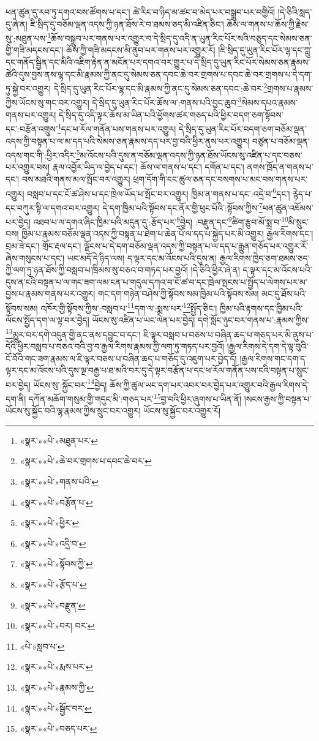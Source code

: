 ཕན་ཚུན་དུ་རབ་ཏུ་དགའ་བས་ཚོགས་པ་དང་། ཚེ་རིང་བ་ཉིད་མ་ཚང་བ་མེད་པར་བསྒྲུབ་པར་བགྱིའོ། །དེ་ཅིའི་སླད་དུ་ཞེ་ན། ཇི་སྲིད་དུ་བཅོམ་ལྡན་འདས་ཀྱི་ཉན་ཐོས་རེ་བ་ཐམས་ཅད་མི་འཛིན་ཅིང་། ཆོས་ལ་གནས་པ་ཆོས་ཀྱི་རྗེས་སུ་:མཐུན་པས་\footnote{«སྣར་»«པེ་»མཐུན་པར་}ཆོས་བསྒྲུབ་པར་གནས་པར་འགྱུར་བ་དེ་སྲིད་དུ་འདི་ན་ཡུན་རིང་པོར་སའི་བཅུད་དང་སེམས་ཅན་གྱི་གཟི་མདངས་དང་། ཆོས་ཀྱི་གཟི་མདངས་མི་ནུབ་པར་གནས་པར་འགྱུར་རོ། །ཇི་སྲིད་དུ་ཡུན་རིང་པོར་ལྷ་དང་ཀླུ་དང་གནོད་སྦྱིན་དང་མིའི་འཇིག་རྟེན་ན་མངོན་པར་དགའ་བར་གྱུར་པ་དེ་སྲིད་དུ་ཡུན་རིང་པོར་སེམས་ཅན་རྣམས་ཚེའི་དུས་བྱས་ནས་ལྷ་དང་མི་རྣམས་ཀྱི་ནང་དུ་སེམས་ཅན་དབང་ཆེ་བར་གྲགས་པ་དབང་ཆེ་བར་གྲགས་པ་དེ་དག་ཏུ་སྐྱེ་བར་འགྱུར། དེ་སྲིད་དུ་ཡུན་རིང་པོར་ལྷ་དང་མི་རྣམས་ཀྱི་ནང་དུ་སེམས་ཅན་དབང་:ཆེ་བར་\footnote{«སྣར་»«པེ་»ཆེ་བར་གྲགས་པ་དབང་ཆེ་བར་}གྲགས་པ་རྣམས་ཀྱིས་ཡོངས་སུ་གང་བར་འགྱུར། དེ་སྲིད་དུ་ཡུན་རིང་པོར་ཆོས་ལ་:གནས་པའི་བྱང་ཆུབ་\footnote{«སྣར་»«པེ་»གནས་པའི་}སེམས་དཔའ་རྣམས་གནས་པར་འགྱུར། དེ་སྲིད་དུ་འདི་ལྟར་ཆོས་མ་ཡིན་པའི་ཕྱོགས་ཚར་གཅད་པའི་ཕྱིར་བདག་ཅག་སྟོབས་དང་:བརྩོན་འགྲུས་\footnote{«སྣར་»«པེ་»བརྩོན་པ་}དང་ཕ་རོལ་གནོན་པས་གནས་པར་འགྱུར། དེ་སྲིད་དུ་ཡུན་རིང་པོར་བདག་ཅག་བཅོམ་ལྡན་འདས་ཀྱི་བསྟན་པ་ལ་མ་དད་པའི་སེམས་ཅན་རྣམས་དད་པར་བྱ་བའི་ཕྱིར་ནུས་པར་འགྱུར། བཙུན་པ་བཅོམ་ལྡན་འདས་གང་གི་:ཕྱིར་འདིར་\footnote{«སྣར་»«པེ་»ཕྱིར་}མ་འོངས་པའི་དུས་ན་བཅོམ་ལྡན་འདས་ཀྱི་ཉན་ཐོས་ཡོངས་སུ་འཛིན་པ་དང་བཅས་པར་འགྱུར་བས། རྣལ་འབྱོར་ཡིད་ལ་བྱེད་པ་དང་། ཆོས་ལ་གནས་པ་དང་། དགོན་པ་དང་། ནགས་ཁྲོད་ན་གནས་པ་དང་། བས་མཐའི་གནས་མལ་སྤོང་བར་འགྱུར། ཕྲག་དོག་གི་ངང་ཚུལ་ཅན་དང་བསགས་པ་མང་བས་གནས་པར་འགྱུར། བསླབ་པ་དང་ངོ་ཚ་ཤེས་པ་དང་ཁྲེལ་ཡོད་པ་སྤོང་བར་འགྱུར། ཁྱིམ་ན་གནས་པ་དང་:འདྲེ་བ་\footnote{«སྣར་»«པེ་»འདྲི་བ་}དང་། རྙེད་པ་དང་བཀུར་སྟི་ལ་དགའ་བར་འགྱུར། དེ་དག་ཁྱིམ་པའི་སྟོབས་དང་ནོར་གྱི་ཕུང་པོའི་:སྟོབས་ཀྱིས་\footnote{«སྣར་»«པེ་»སྟོབས་ཀྱི་}ཕན་ཚུན་འཇོམས་པར་བྱེད། འཐབ་པ་ལ་དགའ་ཞིང་ཁྱིམ་པའི་མདུན་དུ་:རྩོད་པར་\footnote{«སྣར་»«པེ་»རྩོད་པ་}བྱེད། :བརྫུན་དང་\footnote{«སྣར་»«པེ་»བརྫུན་}ཚིག་རྩུབ་མོ་སྨྲ་བ་\footnote{«སྣར་»«པེ་»བར། བར་}མི་སྲུང་བས། ཁྱིམ་པ་རྣམས་བཅོམ་ལྡན་འདས་ཀྱི་བསྟན་པ་ཐེག་པ་ཆེན་པོ་ལ་དད་པ་སྐྱེད་པར་མི་འགྱུར། རྒྱལ་རིགས་དང་། བྲམ་ཟེ་དང་། གྲོང་རྡལ་དང་། ལྗོངས་པ་དེ་དག་བཅོམ་ལྡན་འདས་ཀྱི་བསྟན་པ་ལ་དད་པ་རྒྱུན་གཅོད་པར་འགྱུར་རོ་ཞེས་གསུངས་པ་དང་། ཡང་མདོ་དེ་ཉིད་ལས། ད་ལྟར་དང་མ་འོངས་པའི་དུས་ན། རྒྱལ་རིགས་ཁྱེད་ཅག་ཐམས་ཅད་ཀྱི་ལག་ཏུ་ཉན་ཐོས་ཀྱི་བསླབ་པ་ཁྲིམས་སུ་བཅའ་བ་གཏད་པར་བྱའོ། །དེ་ཅིའི་ཕྱིར་ཞེ་ན། ད་ལྟར་དང་མ་འོངས་པའི་དུས་ན་ངའི་བསྟན་པ་ལ་གང་ཟག་ལམ་ངན་པ་གདུལ་དཀའ་བ་ངོ་ཚ་བ་དང་ཁྲེལ་སྤངས་པ་སྤྱོད་པ་ལེགས་པར་མ་བྱས་པ་རྣམས་གནས་པར་འགྱུར། གང་དག་གཉེན་བཤེས་ཀྱི་སྟོབས་སམ་ཁྱིམ་པའི་སྟོབས་སམ། མང་དུ་ཐོས་པའི་སྟོབས་སམ། འཁོར་གྱི་སྟོབས་ཀྱིས་:བསླབ་པ་\footnote{«པེ་»སླབ་པ་}དག་ལ་:སྨས་པར་\footnote{«སྣར་»«པེ་»རྨས་པར་}སྤྱོད་ཅིང་། ཁྱིམ་པའི་རྟགས་དང་ཁྱིམ་པའི་ལོངས་སྤྱོད་དག་ལ་ལྟ་བར་བྱེད། ཡོངས་སུ་འཛིན་པ་ཡང་ལེན་པར་བྱེད། དགེ་སློང་ཉུང་བར་གནས་པ་:རྣམས་ཀྱིས་\footnote{«སྣར་»«པེ་»རྣམས་ཀྱི་}མྱུར་བར་དགེ་འདུན་གྱི་ནང་ནས་དབྱུང་བ་དང་། ཇི་ལྟར་བསླབ་པ་བཅས་པ་བཞིན་ཆད་པ་གཅད་པར་མི་ནུས་པ་དེའི་ཕྱིར་བསླབ་པ་བཅའ་བའི་བྱ་བ་རྒྱལ་རིགས་རྣམས་ཀྱི་ལག་ཏུ་གཏད་པར་བྱའོ། །རྒྱལ་རིགས་དེ་དག་དེ་ལྟ་བུའི་ངོ་བོའི་གང་ཟག་རྣམས་ལ་ཇི་ལྟར་བཅས་པ་བཞིན་ཆད་པ་གཅོད་དུ་འཇུག་པར་བྱེད་དོ། །རྒྱལ་རིགས་གང་དག་ད་ལྟར་དང་མ་འོངས་པའི་དུས་ལྔ་བརྒྱ་པ་ཐ་མའི་བར་དུ་དེ་ལྟར་བརྩོན་པ་དང་ཕ་རོལ་གནོན་པས་ངའི་བསྟན་པ་སྲུང་བར་བྱེད། ཡོངས་སུ་:སྐྱོང་བར་\footnote{«སྣར་»«པེ་»སྦྱོང་བར་}བྱེད། ཆོས་ཀྱི་ཚུལ་ཡང་དག་པར་འབར་བར་བྱེད་པར་འགྱུར་བའི་རྒྱལ་རིགས་དེ་དག་ནི། དཀོན་མཆོག་གསུམ་གྱི་གདུང་མི་:གཅད་པར་\footnote{«སྣར་»«པེ་»བཅད་པར་}བྱ་བའི་ཕྱིར་ཞུགས་པ་ཡིན་ནོ། །སངས་རྒྱས་ཀྱི་བསྟན་པ་ཡོངས་སུ་སྐྱོང་བའི་ལྷ་རྣམས་ཀྱིས་སྲུང་བར་འགྱུར། ཡོངས་སུ་སྐྱོང་བར་འགྱུར་རོ། 